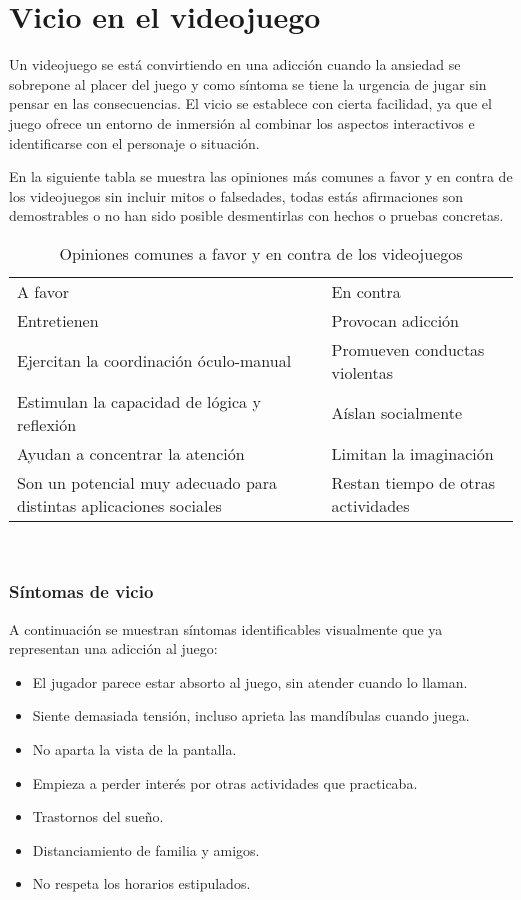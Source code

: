 \section{Vicio en el videojuego}\label{vicioVJ}
Un videojuego se está convirtiendo en una adicción cuando la ansiedad se sobrepone al placer del juego y como síntoma se tiene la urgencia de jugar sin pensar en las consecuencias. El vicio se establece con cierta facilidad, ya que el juego ofrece un entorno de inmersión al combinar los aspectos interactivos e identificarse con el personaje o situación.

En la siguiente tabla se muestra las opiniones más comunes a favor y en contra de los videojuegos sin incluir mitos o falsedades, todas estás afirmaciones son demostrables o no han sido posible desmentirlas con hechos o pruebas concretas.
\begin{table}[htbp]
	\centering
	\caption{Opiniones comunes a favor y en contra de los videojuegos}
	\label{tab:tablaOpinión}
	\begin{tabular}{ll}
		A favor                                                            & En contra                          \\
		Entretienen                                                        & Provocan adicción                  \\
		Ejercitan la coordinación óculo-manual                             & Promueven conductas violentas      \\
		Estimulan la capacidad de lógica y reflexión                       & Aíslan socialmente                 \\
		Ayudan a concentrar la atención                                    & Limitan la imaginación             \\
		Son un potencial muy adecuado para distintas aplicaciones sociales & Restan tiempo de otras actividades
	\end{tabular}
\end{table}
\\[1pt]
	
\subsubsection{Síntomas de vicio}
A continuación se muestran síntomas identificables visualmente que ya representan una adicción al juego:
\begin{itemize}
	\item El jugador parece estar absorto al juego, sin atender cuando lo llaman.
	\item Siente demasiada tensión, incluso aprieta las mandíbulas cuando juega.
	\item No aparta la vista de la pantalla.
	\item Empieza a perder interés por otras actividades que practicaba.
	\item Trastornos del sueño.
	\item Distanciamiento de familia y amigos.
	\item No respeta los horarios estipulados.
\end{itemize}
\\[1pt]

